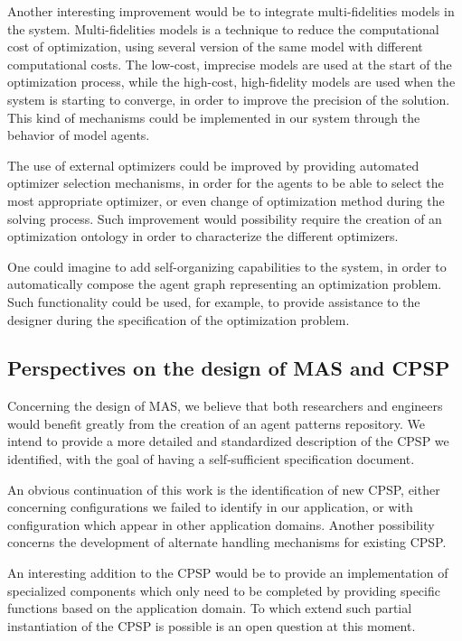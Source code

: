 Another interesting improvement would be to integrate multi-fidelities models in the system. Multi-fidelities models is a technique to reduce the computational cost of optimization, using several version of the same model with different computational costs. The low-cost, imprecise models are used at the start of the optimization process, while the high-cost, high-fidelity models are used when the system is starting to converge, in order to improve the precision of the solution. This kind of mechanisms could be implemented in our system through the behavior of model agents.

The use of external optimizers could be improved by providing automated optimizer selection mechanisms, in order for the agents to be able to select the most appropriate optimizer, or even change of optimization method during the solving process. Such improvement would possibility require the creation of an optimization ontology in order to characterize the different optimizers.

One could imagine to add self-organizing capabilities to the system, in order to automatically compose the agent graph representing an optimization problem. Such functionality could be used, for example, to provide assistance to the designer during the specification of the optimization problem.

\subsection*{Perspectives on the design of MAS and CPSP}

Concerning the design of MAS, we believe that both researchers and engineers would benefit greatly from the creation of an agent patterns repository. We intend to provide a more detailed and standardized description of the CPSP we identified, with the goal of having a self-sufficient specification document.

An obvious continuation of this work is the identification of new CPSP, either concerning configurations we failed to identify in our application, or with configuration which appear in other application domains. Another possibility concerns the development of alternate handling mechanisms for existing CPSP.

An interesting addition to the CPSP would be to provide an implementation of specialized components which only need to be completed by providing specific functions based on the application domain. To which extend such partial instantiation of the CPSP is possible is an open question at this moment.

